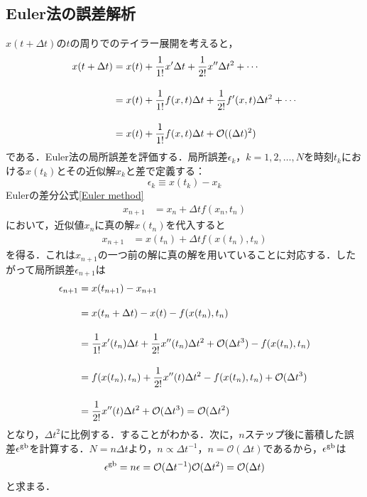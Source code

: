 \subsection{Euler法の誤差解析}
$x(t+\Delta t)$の$t$の周りでのテイラー展開を考えると，
\begin{align}
	x(t+\Delta t)&=x(t) +\frac{1}{1!}x^{\prime}\Delta t +\frac{1}{2!}x^{\prime\prime}\Delta t^2+\cdots\nn[10pt]
	&=x(t) +\frac{1}{1!}f(x,t)\Delta t +\frac{1}{2!}f^{\prime}(x,t)\Delta t^2+\cdots\nn[10pt]
	&=x(t) +\frac{1}{1!}f(x,t)\Delta t +\mathcal{O}((\Delta t)^2)
\end{align}
である．Euler法の局所誤差を評価する．局所誤差$\epsilon_k$，$k=1,2,\ldots,N$を時刻$t_{k}$における$x(t_k)$とその近似解$x_k$と差で定義する：
\begin{equation}
	\epsilon_{k}\equiv x(t_{k})-x_k
\end{equation}
Eulerの差分公式\eqref{Euler method}
\begin{align}
	x_{n+1}&=x_n+\Delta t f(x_n, t_n)
\end{align}
において，近似値$x_n$に真の解$x(t_n)$を代入すると
\begin{align}
	x_{n+1}&=x(t_n)+\Delta t f(x(t_n), t_n)
\end{align}
を得る．これは$x_{n+1}$の一つ前の解に真の解を用いていることに対応する．したがって局所誤差$\epsilon_{n+1}$は
\begin{align}
	\epsilon_{n+1}&=x(t_{n+1})-x_{n+1}\nn[10pt]
	&=x(t_n+\Delta t)-x(t)-f(x(t_n), t_n)\nn[10pt]
	&=
	\frac{1}{1!}x^\prime(t_n)\Delta t +\frac{1}{2!}x^{\prime\prime}(t_n)\Delta t^2+\mathcal{O}(\Delta t^3)
	-f(x(t_n),t_n)\nn[10pt]
	&=f(x(t_n),t_n)+\frac{1}{2!}x^{\prime\prime}(t)\Delta t^2 -f(x(t_n),t_n)+\mathcal{O}(\Delta t^3)\\[10pt]
	&=\frac{1}{2!}x^{\prime\prime}(t)\Delta t^2+\mathcal{O}(\Delta t^3)
	=\mathcal{O}(\Delta t^2)
\end{align}
となり，$\Delta t^2$に比例する．することがわかる．次に，$n$ステップ後に蓄積した誤差$\epsilon^{\rm{gb}}$を計算する．$N=n\Delta t$より，$n \propto \Delta t^{-1}$，$n=\mathcal{O}(\Delta t)$であるから，$\epsilon^{\rm{gb}}$は
\begin{equation}
	\epsilon^{\rm{gb}}=n\epsilon
	=\mathcal{O}(\Delta t^{-1})\mathcal{O}(\Delta t^2)
	=\mathcal{O}(\Delta t)
\end{equation}
と求まる．



